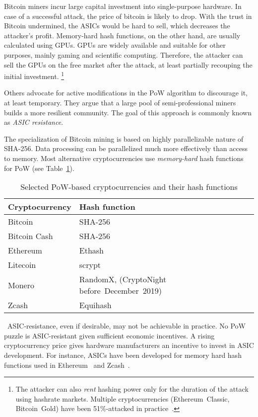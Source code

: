 Bitcoin miners incur large capital investment into single-purpose hardware.
In case of a successful attack, the price of bitcoin is likely to drop.
With the trust in Bitcoin undermined, the ASICs would be hard to sell, which decreases the attacker's profit.
Memory-hard hash functions, on the other hand, are usually calculated using GPUs.
GPUs are widely available and suitable for other purposes, mainly gaming and scientific computing.
Therefore, the attacker can sell the GPUs on the free market after the attack, at least partially recouping the initial investment.
 \footnote{The attacker can also \textit{rent} hashing power only for the duration of the attack using hashrate markets. Multiple cryptocurrencies (Ethereum~Classic, Bitcoin~Gold) have been 51\%-attacked in practice~\cite{Xazax3102019}.}

Others advocate for active modifications in the PoW algorithm to discourage it, at least temporary.
They argue that a large pool of semi-professional miners builds a more resilient community.
The goal of this approach is commonly known as \textit{ASIC resistance}.

The specialization of Bitcoin mining is based on highly parallelizable nature of SHA-256.
Data processing can be parallelized much more effectively than access to memory.
Most alternative cryptocurrencies use \textit{memory-hard} hash functions for PoW (see Table~\ref{tab:pow-coins-hash-functions}).

\begin{table}[]
	\begin{tabular}{|l|l|}
		\hline
		\textbf{Cryptocurrency} & \textbf{Hash function} \\ \hline
		Bitcoin & SHA-256 \\ \hline
		Bitcoin Cash & SHA-256 \\ \hline
		Ethereum & Ethash \\ \hline
		Litecoin & scrypt \\ \hline
		Monero & RandomX, (CryptoNight before~December~2019) \\ \hline
		Zcash & Equihash \\ \hline
	\end{tabular}
	\caption{Selected PoW-based cryptocurrencies and their hash functions}
	\label{tab:pow-coins-hash-functions}
\end{table}
\
ASIC-resistance, even if desirable, may not be achievable in practice.
No PoW puzzle is ASIC-resistant given sufficient economic incentives.
A rising cryptocurrency price gives hardware manufacturers an incentive to invest in ASIC development.
For instance, ASICs have been developed for memory hard hash functions used in Ethereum~\cite{OLeary2018} and Zcash~\cite{Floyd2018}.

